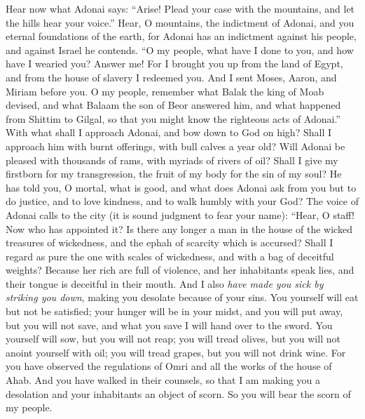 \begin{biblechapter} %
 Hear now what Adonai says: 
“Arise! Plead your case with the mountains, 
and let the hills hear your voice.”
\verse Hear, O mountains, the indictment of Adonai, 
and you eternal foundations of the earth, 
for Adonai has an indictment against his people, 
and against Israel he contends.
\verse “O my people, what have I done to you, 
and how have I wearied you? Answer me!
\verse For I brought you up from the land of Egypt, 
and from the house of slavery I redeemed you. 
And I sent Moses, Aaron, and Miriam before you.
\verse O my people, remember what Balak the king of Moab devised, 
and what Balaam the son of Beor answered him, 
and what happened from Shittim to Gilgal, 
so that you might know the righteous acts of Adonai.”
 With what shall I approach Adonai, 
and bow down to God on high? 
Shall I approach him with burnt offerings, 
with bull calves a year old?
\verse Will Adonai be pleased with thousands of rams, 
with myriads of rivers of oil? 
Shall I give my firstborn for my transgression, 
the fruit of my body for the sin of my soul?
\verse He has told you, O mortal, what is good, 
and what does Adonai ask from you 
but to do justice, and to love kindness, 
and to walk humbly with your God?
 The voice of Adonai calls to the city 
(it is sound judgment to fear your name): 
“Hear, O staff! Now who has appointed it?
\verse Is there any longer a man in the house of the wicked 
treasures of wickedness, 
and the ephah of scarcity which is accursed?
\verse Shall I regard as pure the one with scales of wickedness, 
and with a bag of deceitful weights?
\verse Because her rich are full of violence, 
and her inhabitants speak lies, 
and their tongue is deceitful in their mouth.
\verse And I also \textit{have made you sick by striking you down}, 
making you desolate because of your sins.
\verse You yourself will eat but not be satisfied; 
your hunger will be in your midst, 
and you will put away, but you will not save, 
and what you save I will hand over to the sword.
\verse You yourself will sow, but you will not reap; 
you will tread olives, but you will not anoint yourself with oil; 
you will tread grapes, but you will not drink wine.
\verse For you have observed the regulations of Omri 
and all the works of the house of Ahab. 
And you have walked in their counsels, 
so that I am making you a desolation 
and your inhabitants an object of scorn. 
So you will bear the scorn of my people.
\end{biblechapter}

